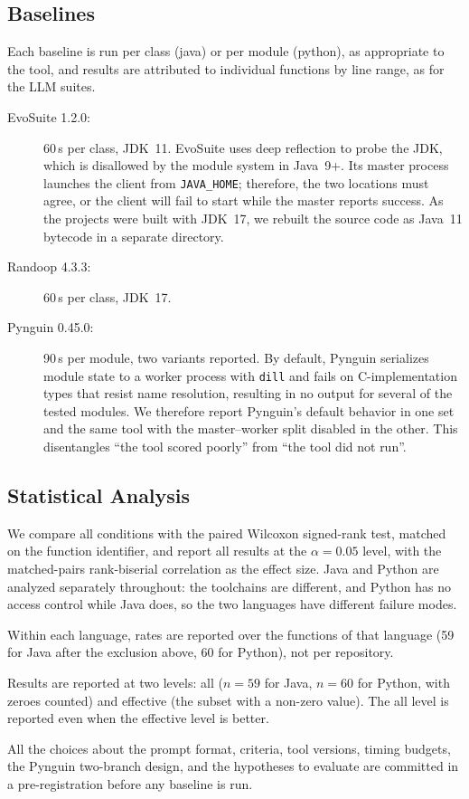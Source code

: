 \subsection{Baselines}\label{sec:baselines}

Each baseline is run per class (java) or per module (python), as appropriate to the tool, and
results are attributed to individual functions by line range, as for the LLM suites.

\begin{description}
  \item[EvoSuite 1.2.0:] 60\,s per class, JDK~11. EvoSuite uses deep reflection to probe the
    JDK, which is disallowed by the module system in Java~9+. Its master process launches the
    client from \texttt{JAVA\_HOME}; therefore, the two locations must agree, or the client
    will fail to start while the master reports success. As the projects were built with
    JDK~17, we rebuilt the source code as Java~11 bytecode in a separate directory.
  \item[Randoop 4.3.3:] 60\,s per class, JDK~17.
  \item[Pynguin 0.45.0:] 90\,s per module, two variants reported. By default, Pynguin
    serializes module state to a worker process with \texttt{dill} and fails on
    C-implementation types that resist name resolution, resulting in no output for several of
    the tested modules. We therefore report Pynguin's default behavior in one set and the same
    tool with the master--worker split disabled in the other. This disentangles ``the tool
    scored poorly'' from ``the tool did not run''.
\end{description}

\subsection{Statistical Analysis}\label{sec:stats}

We compare all conditions with the paired Wilcoxon signed-rank test, matched on the function
identifier, and report all results at the $\alpha=0.05$ level, with the matched-pairs
rank-biserial correlation as the effect size. Java and Python are analyzed separately
throughout: the toolchains are different, and Python has no access control while Java does, so
the two languages have different failure modes.

Within each language, rates are reported over the functions of that language (59 for Java
after the exclusion above, 60 for Python), not per repository.

Results are reported at two levels: all ($n=59$ for Java, $n=60$ for Python, with zeroes
counted) and effective (the subset with a non-zero value). The all level is reported even when
the effective level is better.

All the choices about the prompt format, criteria, tool versions, timing budgets, the Pynguin
two-branch design, and the hypotheses to evaluate are committed in a pre-registration before
any baseline is run.
